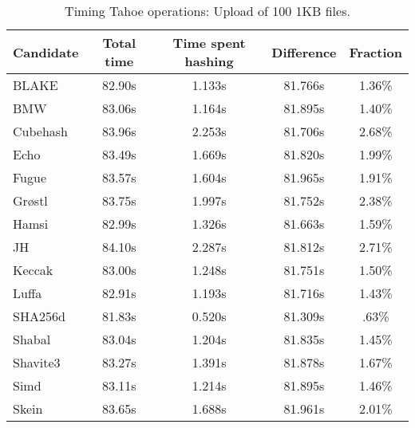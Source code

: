 \begin{table}[h]
  \centering
  \caption{Timing Tahoe operations: Upload of 100 1KB files.}
  \begin{tabular}{ | l | c | c | c | c | }
    \hline
    Candidate & Total time & Time spent hashing & Difference & Fraction \\ \hline
    BLAKE     &  82.90s  &  1.133s  &  81.766s  &  1.36\%  \\  \hline
    BMW       &  83.06s  &  1.164s  &  81.895s  &  1.40\%  \\  \hline
    Cubehash  &  83.96s  &  2.253s  &  81.706s  &  2.68\%  \\  \hline
    Echo      &  83.49s  &  1.669s  &  81.820s  &  1.99\%  \\  \hline
    Fugue     &  83.57s  &  1.604s  &  81.965s  &  1.91\%  \\  \hline
    Grøstl    &  83.75s  &  1.997s  &  81.752s  &  2.38\%  \\  \hline
    Hamsi     &  82.99s  &  1.326s  &  81.663s  &  1.59\%  \\  \hline
    JH        &  84.10s  &  2.287s  &  81.812s  &  2.71\%  \\  \hline
    Keccak    &  83.00s  &  1.248s  &  81.751s  &  1.50\%  \\  \hline
    Luffa     &  82.91s  &  1.193s  &  81.716s  &  1.43\%  \\  \hline
    SHA256d   &  81.83s  &  0.520s  &  81.309s  &  .63\%   \\  \hline
    Shabal    &  83.04s  &  1.204s  &  81.835s  &  1.45\%  \\  \hline
    Shavite3  &  83.27s  &  1.391s  &  81.878s  &  1.67\%  \\  \hline
    Simd      &  83.11s  &  1.214s  &  81.895s  &  1.46\%  \\  \hline
    Skein     &  83.65s  &  1.688s  &  81.961s  &  2.01\%  \\  \hline
  \end{tabular}
  \label{tbl:hashingtimes:put1kb}
\end{table}

